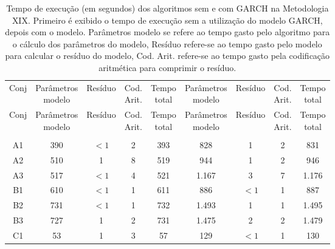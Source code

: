 \begin{center}
\begin{longtable}{ccccc|cccc}
\toprule
\rowcolor{white}
\caption[Metodologia XIX: tempo de execução]{Tempo de execução (em segundos)
dos algoritmos sem e com GARCH na Metodologia XIX. Primeiro é exibido o tempo de
execução sem a utilização do modelo GARCH, depois com o modelo. Parâmetros
modelo se refere ao tempo gasto pelo algoritmo para o cálculo dos parâmetros do
modelo, Resíduo refere-se ao tempo gasto pelo modelo para calcular o resíduo do
modelo, Cod. Arit. refere-se ao tempo gasto pela codificação aritmética para
comprimir o resíduo.} \label{tab:EvolucaoEntropiaMet19}\\
\midrule
Conj & \specialcell{Parâmetros\\modelo} &
Resíduo & \specialcell{Cod.\\Arit.} & \specialcell{Tempo\\total} &
\specialcell{Parâmetros\\modelo} &
Resíduo & \specialcell{Cod.\\Arit.} & \specialcell{Tempo\\total} \\
\midrule
\endfirsthead 
\midrule
\rowcolor{white}
Conj & \specialcell{Parâmetros\\modelo} &
Resíduo & \specialcell{Cod.\\Arit.} & \specialcell{Tempo\\total} &
\specialcell{Parâmetros\\modelo} &
Resíduo & \specialcell{Cod.\\Arit.} & \specialcell{Tempo\\total} \\
\toprule
\endhead
\midrule \\ %
\endfoot
\bottomrule 
\endlastfoot
A1&390&$<1$&2&393&828&1&2&831\\
A2&510&1&8&519&944&1&2&946\\
A3&517&$<1$&4&521&1.167&3&7&1.176\\
B1&610&$<1$&1&611&886&$<1$&1&887\\
B2&731&$<1$&1&732&1.493&1&1&1.495\\
B3&727&1&2&731&1.475&2&2&1.479\\
C1&53&1&3&57&129&$<1$&1&130\\

\end{longtable}
\end{center}
